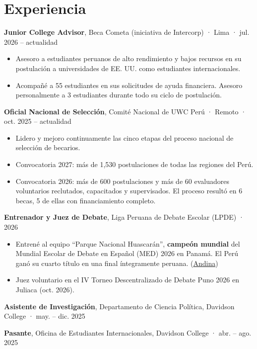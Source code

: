 \documentclass[10pt,a4paper]{article}
\begin{document}
\section*{Experiencia}
\smallskip
\textbf{Junior College Advisor}, Beca Cometa (iniciativa de Intercorp) · Lima · jul. 2026 – actualidad\par
\begin{itemize}
\item Asesoro a estudiantes peruanos de alto rendimiento y bajos recursos en su postulación a universidades de EE. UU. como estudiantes internacionales.
\item Acompañé a 55 estudiantes en sus solicitudes de ayuda financiera. Asesoro personalmente a 3 estudiantes durante todo su ciclo de postulación.
\end{itemize}
\smallskip
\textbf{Oficial Nacional de Selección}, Comité Nacional de UWC Perú · Remoto · oct. 2025 – actualidad\par
\begin{itemize}
\item Lidero y mejoro continuamente las cinco etapas del proceso nacional de selección de becarios.
\item Convocatoria 2027: más de 1,530 postulaciones de todas las regiones del Perú.
\item Convocatoria 2026: más de 600 postulaciones y más de 60 evaluadores voluntarios reclutados, capacitados y supervisados. El proceso resultó en 6 becas, 5 de ellas con financiamiento completo.
\end{itemize}
\smallskip
\textbf{Entrenador y Juez de Debate}, Liga Peruana de Debate Escolar (LPDE) · 2026\par
\begin{itemize}
\item Entrené al equipo ``Parque Nacional Huascarán'', \textbf{campeón mundial} del Mundial Escolar de Debate en Español (MED) 2026 en Panamá. El Perú ganó su cuarto título en una final íntegramente peruana. (\href{https://andina.pe/agencia/noticia-peru-se-corona-tetracampeon-el-mundial-debate-escolar-espanol-2026-1091241.aspx}{Andina})
\item Juez voluntario en el IV Torneo Descentralizado de Debate Puno 2026 en Juliaca (oct. 2026).
\end{itemize}
\smallskip
\textbf{Asistente de Investigación}, Departamento de Ciencia Política, Davidson College · may. – dic. 2025\par
\smallskip
\textbf{Pasante}, Oficina de Estudiantes Internacionales, Davidson College · abr. – ago. 2025\par
\end{document}
